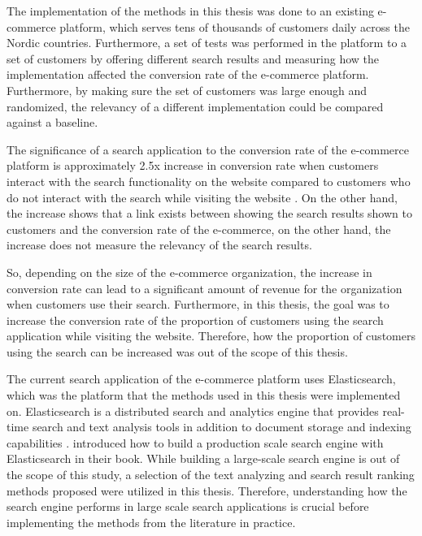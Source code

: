 The implementation of the methods in this thesis was done to an existing e-commerce platform, 
which serves tens of thousands of customers daily across the Nordic countries. 
Furthermore, a set of tests was performed in the platform to a set of customers by offering different search results 
and measuring how the implementation affected the conversion rate of the e-commerce platform.
Furthermore, by making sure the set of customers was large enough and randomized, 
the relevancy of a different implementation could be compared against a baseline.


The significance of a search application to the conversion rate of the e-commerce platform is 
approximately 2.5x increase in conversion rate
when customers interact with the search functionality on the website compared to
customers who do not interact with the search while visiting the website \cite{powerAnalytics}.
On the other hand, the increase shows that a link exists between showing the search results 
shown to customers and the conversion rate of the e-commerce, 
on the other hand, the increase does not measure the relevancy of the search results.

So, depending on the size of the e-commerce organization, the increase in conversion rate can lead to 
a significant amount of revenue for the organization when customers use their search.
Furthermore, in this thesis, the goal was to increase the conversion rate of the proportion of customers 
using the search application while visiting the website. 
Therefore, how the proportion of customers using the search can be increased was out of the scope of this thesis.


The current search application of the e-commerce platform uses Elasticsearch, which was
the platform that the methods used in this thesis were implemented on.
Elasticsearch is a distributed search and analytics engine that provides 
real-time search and text analysis tools in addition to document storage and indexing capabilities \cite{elasticIntro}. 
\citeauthor{relevantSearch} \cite{relevantSearch} introduced how to build 
a production scale search engine with Elasticsearch in their book. 
While building a large-scale search engine is out of the scope of this study, 
a selection of the text analyzing and search result ranking methods \citeauthor{relevantSearch} \cite{relevantSearch} 
proposed were utilized in this thesis.
Therefore, understanding how the search engine performs in large scale search applications 
is crucial before implementing the methods from the literature in practice.


